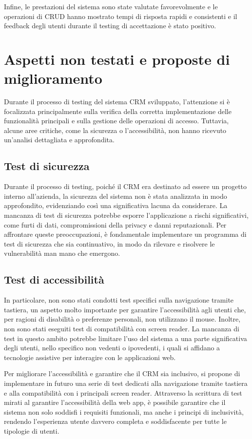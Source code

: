 \documentclass[target=bach,aauheader=,style=]{thud}
\begin{document}
\noindent Infine, le prestazioni del sistema sono state valutate favorevolmente e le operazioni di CRUD hanno mostrato tempi di risposta rapidi e consistenti e il feedback degli utenti durante il testing di accettazione è stato positivo.

\section{Aspetti non testati e proposte di miglioramento}
Durante il processo di testing del sistema CRM sviluppato, l'attenzione si è focalizzata principalmente sulla verifica della corretta implementazione delle funzionalità principali e sulla gestione delle operazioni di accesso. Tuttavia, alcune aree critiche, come la sicurezza o l'accessibilità, non hanno ricevuto un'analisi dettagliata e approfondita. 

\subsection{Test di sicurezza}
Durante il processo di testing, poiché il CRM era destinato ad essere un progetto interno all'azienda, la sicurezza del sistema non è stata analizzata in modo approfondito, evidenziando così una significativa lacuna da considerare. La mancanza di test di sicurezza potrebbe esporre l'applicazione a rischi significativi, come furti di dati, compromissioni della privacy e danni reputazionali. Per affrontare queste preoccupazioni, è fondamentale implementare un programma di test di sicurezza che sia continuativo, in modo da rilevare e risolvere le vulnerabilità man mano che emergono. 

\subsection{Test di accessibilità}
In particolare, non sono stati condotti test specifici sulla navigazione tramite tastiera, un aspetto molto importante per garantire l'accessibilità agli utenti che, per ragioni di disabilità o preferenze personali, non utilizzano il mouse. Inoltre, non sono stati eseguiti test di compatibilità con screen reader. La mancanza di test in questo ambito potrebbe limitare l'uso del sistema a una parte significativa degli utenti, nello specifico non vedenti o ipovedenti, i quali si affidano a tecnologie assistive per interagire con le applicazioni web. 

\noindent Per migliorare l'accessibilità e garantire che il CRM sia inclusivo, si propone di implementare in futuro una serie di test dedicati alla navigazione tramite tastiera e alla compatibilità con i principali screen reader. Attraverso la scrittura di test mirati al garantire l'accessibilità della web app, è possibile garantire che il sistema non solo soddisfi i requisiti funzionali, ma anche i principi di inclusività, rendendo l'esperienza utente davvero completa e soddisfacente per tutte le tipologie di utenti.
\end{document}

